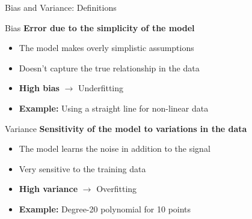 \documentclass[12pt,aspectratio=169]{beamer}
\begin{document}
\begin{frame}{Bias and Variance: Definitions}
\vspace{-0.3cm}

\begin{block}{Bias}
\textbf{Error due to the simplicity of the model}
\begin{itemize}
\item The model makes overly simplistic assumptions
\item Doesn't capture the true relationship in the data
\item \textbf{High bias} $\rightarrow$ Underfitting
\item \textbf{Example:} Using a straight line for non-linear data
\end{itemize}
\end{block}
\vspace{-0.2cm}


\begin{block}{Variance}
\textbf{Sensitivity of the model to variations in the data}
\begin{itemize}
\item The model learns the noise in addition to the signal
\item Very sensitive to the training data
\item \textbf{High variance} $\rightarrow$ Overfitting
\item \textbf{Example:} Degree-20 polynomial for 10 points
\end{itemize}
\end{block}

\end{frame}
\end{document}
